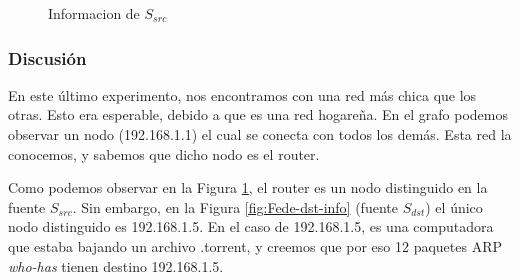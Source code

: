 \begin{figure}[H]
\begin{minipage}{0.5\linewidth}
    \caption{Informacion de $S_{src}$}\label{fig:Fede-src-info}
  \end{minipage}
\end{figure}

\subsubsection{Discusión}

En este último experimento, nos encontramos con una red más chica que los otras. Esto era esperable, debido a que es una red hogareña. En el grafo podemos observar un nodo (192.168.1.1) el cual se conecta con todos los demás. Esta red la conocemos, y sabemos que dicho nodo es el router.

Como podemos observar en la Figura \ref{fig:Fede-src-info}, el router es un nodo distinguido en la fuente $S_{src}$. Sin embargo, en la Figura \ref{fig:Fede-dst-info} (fuente $S_{dst}$) el único nodo distinguido es 192.168.1.5. En el caso de 192.168.1.5, es una computadora que estaba bajando un archivo .torrent, y creemos que por eso 12 paquetes ARP \emph{who-has} tienen destino 192.168.1.5.